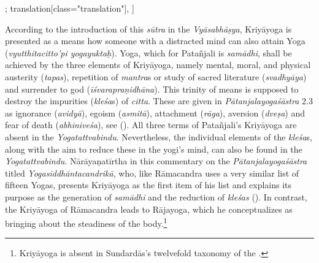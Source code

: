 \begin{alignment}[
  texts=edition[class="edition"];
  translation[class="translation"],
  ]
\begin{translation}
\begin{tlate}[p02_02]
{According to the introduction of this \textit{sūtra} in the \textit{Vyāsabhāṣya}, Kriyāyoga is presented as a means how someone with a distracted mind can also attain Yoga (\textit{vyutthitacitto'pi yogayuktaḥ}). Yoga, which for Patañjali is \textit{samādhi}, shall be achieved by the three elements of Kriyāyoga, namely mental, moral, and physical austerity (\textit{tapas}), repetition of \textit{mantra}s or study of sacred literature (\textit{svadhyāya}) and surrender to god (\textit{īśvarapraṇidhāna}). This trinity of means is supposed to destroy the impurities (\textit{kleśa}s) of \textit{citta}. These are given in \textit{Pātanjalayogaśāstra} 2.3 as ignorance (\textit{avidyā}), egoism (\textit{asmitā}), attachment (\textit{rāga}), aversion (\textit{dveṣa}) and fear of death (\textit{abhiniveśa}), see (\citeauthor[1983:116]{yogasutra}). All three terms of Patañjali's Kriyāyoga are absent in the \textit{Yogatattvabindu}. Nevertheless, the individual elements of the \textit{kleśa}s, along with the aim to reduce these in the yogi's mind, can also be found in the \textit{Yogatattvabindu}. Nārāyaṇatīrtha in this commentary on the \textit{Pātanjalayogaśāstra} titled \textit{Yogasiddhāntacandrikā}, who, like Rāmacandra uses a very similar list of fifteen Yogas, presents Kriyāyoga as the first item of his list and explains its purpose as the generation of \textit{samādhi} and the reduction of \textit{kleśas} (\citeauthor[2000:71]{yogacandrika}). In contrast, the Kriyāyoga of Rāmacandra leads to Rājayoga, which he conceptualizes as bringing about the steadiness of the body.}\footnote{Kriyāyoga is absent in Sundardās's twelvefold taxonomy of the .}\label{kriyayogaend}
\end{tlate}
\end{translation}
\end{alignment}
\pagebreak %
